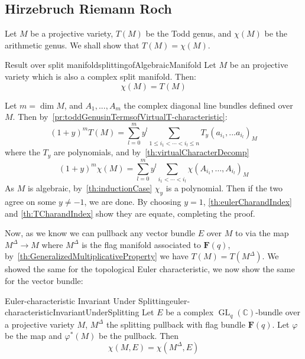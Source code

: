 \documentclass{book}
\newenvironment{Proof}[1][]
  {\begin{ProofTcb}[#1]}
  {\end{ProofTcb}}
\newcommand{\C}{{\mathbb{C}}}
\renewcommand{\phi}{\varphi}
\renewcommand{\bf}[1]{\textbf{#1}}
\newcommand{\GL}{{\operatorname{GL}}}
\begin{document}
\subsection{Hirzebruch Riemann Roch}\label{sec:HRRlineBundle}


Let $M$ be a projective variety, $T(M)$ be the Todd genus, and $\chi(M)$ be the arithmetic genus. We shall
show that $T(M) = \chi(M)$.

\begin{thm}{Result over split manifold}{splittingofAlgebraicManifold}
  Let $M$ be an projective variety which is also a complex split manifold. Then:
  \[
    \chi(M) = T(M)
  \]
\end{thm}

\begin{Proof}
  Let $m = \dim M$, and $A_1, ..., A_m$ the complex diagonal line bundles defined over $M$. Then
  by~\cref{pr:toddGenusinTermsofVirtualT-characteristic}:
  \[
    (1+y)^m T(M) = \sum_{l=0}^my^l \sum_{1 \le i_1 < \cdots < i_l\le n} T_y(a_{i_1}, ... a_{i_l})_M
  \]
  where the $T_y$ are polynomials, and by~\cref{th:virtualCharacterDecomp}
  \[
  (1 + y)^m \chi(M) = \sum_{l=0}^m y^l \sum_{i_1 < \cdots < i_l} \chi(A_{i_1}, \ldots, A_{i_l})_M
  \]
  As $M$ is algebraic, by~\cref{th:inductionCase} $\chi_y$ is a polynomial. Then
  if the two agree on some $y\ne -1$, we are done. By
  choosing $y = 1$, \cref{th:eulerCharandIndex} and \cref{th:TCharandIndex}
  show they are equate, completing the proof.
\end{Proof}

Now, as we know we can pullback any vector bundle $E$ over $M$ to via the map $M^\Delta \to M$ where $M^\Delta$ is the
flag manifold associated to $\bf{F}(q)$, by~\cref{th:GeneralizedMultiplicativeProperty} we have $T(M)
=T(M^\Delta)$. We showed the same for the topological Euler characteristic, we now show the same for the
vector bundle:

\begin{thm}{Euler-characteristic Invariant Under Splitting}{euler-characteristicInvariantUnderSplitting}
  Let $E$ be a complex $\GL_q(\C)$-bundle over a projective variety $M$, $M^\Delta$ the splitting pullback
  with flag bundle $\bf{F}(q)$. Let
  $\phi$ be the map and $\phi^*(M)$ be the pullback. Then
  \[
    \chi(M, E) = \chi(M^\Delta, E)
  \]
\end{thm}
\end{document}
